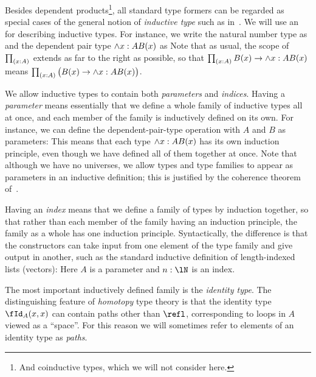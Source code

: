 \documentclass{amsart}
\begin{document}
Besides dependent products\footnote{And coinductive types, which we will not consider here.}, all standard type formers can be regarded as special cases of the general notion of \emph{inductive type} such as in~\cite{gimenez:recursion}.
We will use an  for describing inductive types.
For instance, we write the natural number type as
\indef{\lN}{
  \fzero : \lN \OR
  \fsucc : \lN \to \lN
}
and the dependent pair type $\wedge{x:A} B(x)$ as
Note that as usual, the scope of $\prd{x:A}$ extends as far to the right as possible, so that $\prd{x:A} B(x) \to \sm{x:A} B(x)$ means $\prd{x:A} \big(B(x) \to \sm{x:A} B(x)\big)$.

We allow inductive types to contain both \emph{parameters} and \emph{indices}.
Having a \emph{parameter} means essentially that we define a whole family of inductive types all at once, and each member of the family is inductively defined on its own.
For instance, we can define the dependent-pair-type operation with $A$ and $B$ as parameters:
This means that each type $\wedge{x:A} B(x)$ has its own induction principle, even though we have defined all of them together at once.
Note that although we have no universes, we allow types and type families to appear as parameters in an inductive definition; this is justified by the coherence theorem of~\cite{lw:localuniv}.

Having an \emph{index} means that we define a family of types by induction together, so that rather than each member of the family having an induction principle, the family as a whole has one induction principle.
Syntactically, the difference is that the constructors can take input from one element of the type family and give output in another, such as the standard inductive definition of length-indexed lists (vectors):%
Here $A$ is a parameter and $n:\lN$ is an index.

The most important inductively defined family is the \emph{identity type}.
The distinguishing feature of \emph{homotopy} type theory is that the identity type $\id[A]xx$ can contain paths other than $\refl$, corresponding to loops in $A$ viewed as a ``space''.
For this reason we will sometimes refer to elements of an identity type as \emph{paths}.
\end{document}

